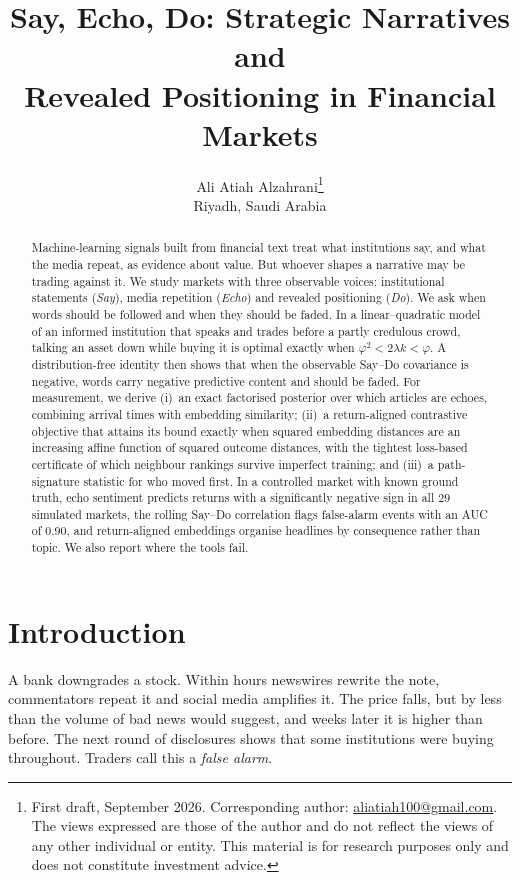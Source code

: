 \documentclass{article}
\title{Say, Echo, Do: Strategic Narratives and\\ Revealed Positioning in Financial Markets}
\author{%
  Ali Atiah Alzahrani\thanks{First draft, September 2026. Corresponding author: \href{mailto:aliatiah100@gmail.com}{aliatiah100@gmail.com}. The views expressed are those of the author and do not reflect the views of any other individual or entity. This material is for research purposes only and does not constitute investment advice.}\\
  {\normalfont Riyadh, Saudi Arabia}
}
\theoremstyle{plain}
\theoremstyle{definition}
\theoremstyle{remark}
\begin{document}
\maketitle

\begin{abstract}
Machine-learning signals built from financial text treat what institutions say, and what the media repeat, as evidence about value. But whoever shapes a narrative may be trading against it. We study markets with three observable voices: institutional statements (\emph{Say}), media repetition (\emph{Echo}) and revealed positioning (\emph{Do}). We ask when words should be followed and when they should be faded. In a linear--quadratic model of an informed institution that speaks and trades before a partly credulous crowd, talking an asset down while buying it is optimal exactly when $\varphi^2<2\lambda k<\varphi$. A distribution-free identity then shows that when the observable Say--Do covariance is negative, words carry negative predictive content and should be faded. For measurement, we derive (i)~an exact factorised posterior over which articles are echoes, combining arrival times with embedding similarity; (ii)~a return-aligned contrastive objective that attains its bound exactly when squared embedding distances are an increasing affine function of squared outcome distances, with the tightest loss-based certificate of which neighbour rankings survive imperfect training; and (iii)~a path-signature statistic for who moved first. In a controlled market with known ground truth, echo sentiment predicts returns with a significantly negative sign in all $29$ simulated markets, the rolling Say--Do correlation flags false-alarm events with an AUC of $0.90$, and return-aligned embeddings organise headlines by consequence rather than topic. We also report where the tools fail.
\end{abstract}

\section{Introduction}\label{sec:intro}

A bank downgrades a stock. Within hours newswires rewrite the note, commentators repeat it and social media amplifies it. The price falls, but by less than the volume of bad news would suggest, and weeks later it is higher than before. The next round of disclosures shows that some institutions were buying throughout. Traders call this a \emph{false alarm}.
\end{document}
